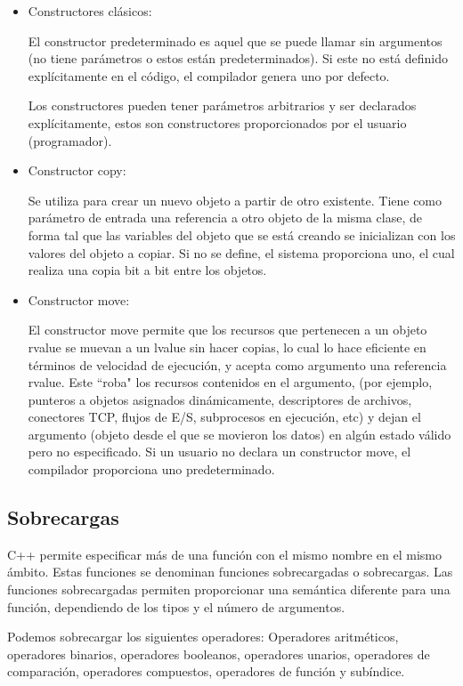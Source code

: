 \documentclass[10pt]{article}
\begin{document}
\begin{itemize}
	\item Constructores cl\'asicos:
	
	El constructor predeterminado es aquel que se puede llamar sin argumentos (no tiene parámetros o estos est\'an predeterminados). Si este no está definido explícitamente en el código, el compilador genera uno por defecto.
	
	Los constructores pueden tener parámetros arbitrarios y ser declarados expl\'icitamente, estos son constructores proporcionados por el usuario (programador).
	
	\item Constructor copy:

	Se utiliza para crear un nuevo objeto a partir de otro existente. Tiene como parámetro de entrada una referencia a otro objeto de la misma clase, de forma tal que las variables del objeto que se está creando se inicializan con los valores del objeto a copiar. Si no se define, el sistema proporciona uno, el cual realiza una copia bit a bit entre los objetos.
	
	\item Constructor move:
	 
	El constructor move permite que los recursos que pertenecen a un objeto rvalue se muevan a un lvalue sin hacer copias, lo cual lo hace eficiente en términos de velocidad de ejecución, y acepta como argumento una referencia rvalue. Este ``roba" los recursos contenidos en el argumento, (por ejemplo, punteros a objetos asignados dinámicamente, descriptores de archivos, conectores TCP, flujos de E/S, subprocesos en ejecución, etc) y dejan el argumento (objeto desde el que se movieron los datos) en algún estado válido pero no especificado. Si un usuario no declara un constructor move, el compilador proporciona uno predeterminado.	
\end{itemize}

\subsection{Sobrecargas}

C++ permite especificar más de una función con el mismo nombre en el mismo ámbito. Estas funciones se denominan funciones sobrecargadas o sobrecargas. Las funciones sobrecargadas permiten proporcionar una semántica diferente para una función, dependiendo de los tipos y el número de argumentos. 

Podemos sobrecargar los siguientes operadores: Operadores aritméticos, operadores binarios, operadores booleanos, operadores unarios, operadores de comparación, operadores compuestos, operadores de función y subíndice.
\end{document}
